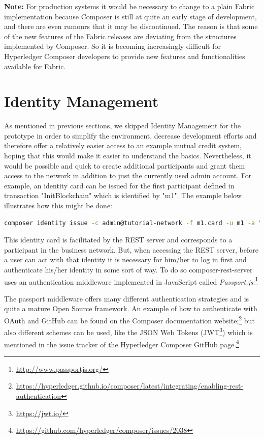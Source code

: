 \textbf{Note:} For production systems it would be necessary to change to a plain Fabric implementation because Composer is still at quite an early stage of development, and there are even rumours that it may be discontinued. The reason is that some of the new features of the Fabric releases are deviating from the structures implemented by Composer. So it is becoming increasingly difficult for Hyperledger Composer developers to provide new features and functionalities available for Fabric.

\section{Identity Management}
\label{sec:id-management}

As mentioned in previous sections, we skipped Identity Management for the prototype in order to simplify the environment, decrease development efforts and therefore offer a relatively easier access to an example mutual credit system, hoping that this would make it easier to understand the basics. Nevertheless, it would be possible and quick to create additional participants and grant them access to the network in addition to just the currently used admin account. For example, an identity card can be issued for the first participant defined in transaction "InitBlockchain" which is identified by "m1". The example below illustrates how this might be done:

\begin{lstlisting}[language=bash]
	composer identity issue -c admin@tutorial-network -f m1.card -u m1 -a "resource:net.sardex.interlace.Individual#m1" -x true 
\end{lstlisting}
\vspace{-0.3cm}

This identity card is facilitated by the REST server and corresponds to a participant in the business network. 
But, when accessing the REST server, before a user can act with that identity it is necessary for him/her to log in first and authenticate his/her identity in some sort of way. To do so composer-rest-server uses an authentication middleware implemented in JavaScript called \textit{Passport.js}.\footnote{\url{http://www.passportjs.org/}}

The passport middleware offers many different authentication strategies and is quite a mature Open Source framework. An example of how to authenticate with OAuth and GitHub can be found on the Composer documentation website;\footnote{\url{https://hyperledger.github.io/composer/latest/integrating/enabling-rest-authentication}} but also different schemes can be used, like the JSON Web Tokens (JWT\footnote{\url{https://jwt.io/}}) which is mentioned in the issue tracker of the Hyperledger Composer GitHub page.\footnote{\url{https://github.com/hyperledger/composer/issues/2038}}

